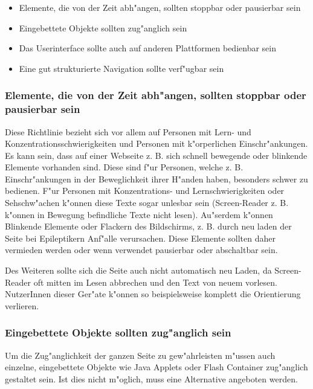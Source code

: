 \documentclass[a4paper,bibtotoc,oneside]{scrbook}
\begin{document}
\begin{itemize}
\item Elemente, die von der Zeit abh"angen, sollten stoppbar oder pausierbar sein \cite[Abschnitt 6.7]{wcag1}
\item Eingebettete Objekte sollten zug"anglich sein\cite[Abschnitt 6.8]{wcag1}
\item Das Userinterface sollte auch auf anderen Plattformen bedienbar sein\cite[Abschnitt 6.9]{wcag1}
\item Eine gut strukturierte Navigation sollte verf"ugbar sein\cite[Abschnitt 6.13]{wcag1}
\end{itemize}

\subsubsection{Elemente, die von der Zeit abh"angen, sollten stoppbar oder pausierbar sein}
Diese Richtlinie bezieht sich vor allem auf Personen mit Lern- und Konzentrationsschwierigkeiten und Personen mit k"orperlichen Einschr"ankungen. Es kann sein, dass auf einer Webseite z. B. sich schnell bewegende oder blinkende Elemente vorhanden sind. Diese sind f"ur Personen, welche z. B. Einschr"ankungen in der Beweglichkeit ihrer H"anden haben, besonders schwer zu bedienen. F"ur Personen mit Konzentrations- und Lernschwierigkeiten oder Sehschw"achen k"onnen diese Texte sogar unlesbar sein (Screen-Reader z. B. k"onnen in Bewegung befindliche Texte nicht lesen). \cite[Abschnitt 6.7]{wcag1}
Au"serdem k"onnen Blinkende Elemente oder Flackern des Bildschirms, z. B. durch neu laden der Seite bei Epileptikern Anf"alle verursachen.
Diese Elemente sollten daher vermieden werden oder wenn verwendet pausierbar oder abschaltbar sein. \cite[S. 45]{barr_webd}

Des Weiteren sollte sich die Seite auch nicht automatisch neu Laden, da Screen-Reader oft mitten im Lesen abbrechen und den Text von neuem vorlesen. NutzerInnen dieser Ger"ate k"onnen so beispielsweise komplett die Orientierung verlieren. \cite[S. 45]{barr_webd}

\subsubsection{Eingebettete Objekte sollten zug"anglich sein}
Um die Zug"anglichkeit der ganzen Seite zu gew"ahrleisten m"ussen auch einzelne, eingebettete Objekte wie Java Applets oder Flash Container zug"anglich gestaltet sein. Ist dies nicht m"oglich, muss eine Alternative angeboten werden. \cite[Abschnitt 6.8]{wcag1}
\end{document}

